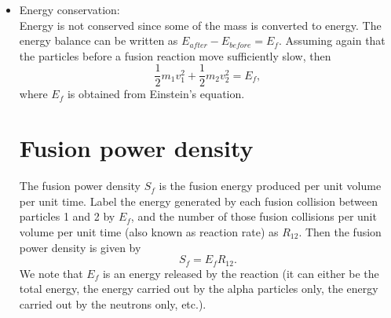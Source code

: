 \documentclass[a4paper,11pt]{report}
\begin{document}
\begin{itemize}
\item Energy conservation: \\
Energy is not conserved since some of the mass is converted to energy. The energy balance can be written as $E_{after} - E_{before} = E_f$. Assuming again that the particles before a fusion reaction move sufficiently slow, then
\begin{equation}
\frac{1}{2} m_1 v_1^2 + \frac{1}{2} m_2 v_2^2 = E_f,
\end{equation}
where $E_f$ is obtained from Einstein's equation.

\section{Fusion power density}
The fusion power density $S_f$ is the fusion energy produced per unit volume per unit time. Label the energy generated by each fusion collision between particles 1 and 2 by $E_f$, and the number of those fusion collisions per unit volume per unit time (also known as reaction rate) as $R_{12}$. Then the fusion power density is given by 
\begin{equation}
    S_f = E_f R_{12}.
\end{equation}
We note that $E_f$ is an energy released by the reaction (it can either be the total energy, the energy carried out by the alpha particles only, the energy carried out by the neutrons only, etc.). 


\end{itemize}
\end{document}
